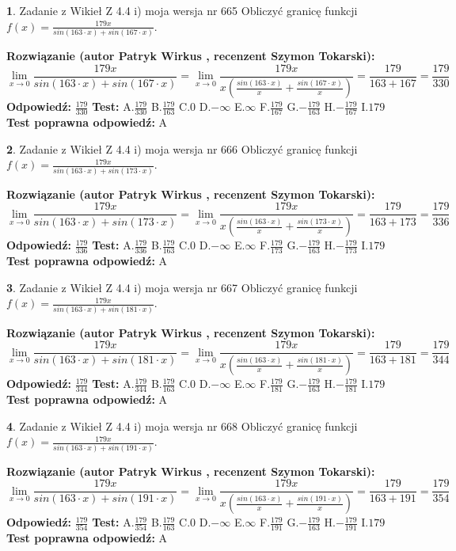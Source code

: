 \documentclass[12pt, a4paper]{article}
\theoremstyle{definition} %
\newtheorem{zad}{}
\newcommand{\zadStart}[1]{\begin{zad}#1\newline}
\newcommand{\zadStop}{\end{zad}}
\newcommand{\rozwStart}[2]{\noindent \textbf{Rozwiązanie (autor #1 , recenzent #2): }\newline}
\newcommand{\rozwStop}{\newline}
\newcommand{\odpStart}{\noindent \textbf{Odpowiedź:}\newline}
\newcommand{\odpStop}{\newline}
\newcommand{\testStart}{\noindent \textbf{Test:}\newline}
\newcommand{\testStop}{\newline}
\newcommand{\kluczStart}{\noindent \textbf{Test poprawna odpowiedź:}\newline}
\newcommand{\kluczStop}{\newline}
\begin{document}
\zadStart{Zadanie z Wikieł Z 4.4 i) moja wersja nr 665}
Obliczyć granicę funkcji $f(x)=\frac{179x}{sin(163\cdot x) +sin(167\cdot x)}$.
\zadStop
\rozwStart{Patryk Wirkus}{Szymon Tokarski}
$$\lim\limits_{x\to 0}\frac{179x}{sin(163\cdot x) +sin(167\cdot x)}=\lim\limits_{x\to 0}\frac{179x}{x(\frac{sin(163\cdot x)}{x}+\frac{sin(167\cdot x)}{x})}=\frac{179}{163+167} = \frac{179}{330}$$
\rozwStop
\odpStart
$\frac{179}{330}$
\odpStop
\testStart
A.$\frac{179}{330}$
B.$\frac{179}{163}$
C.$0$
D.$-\infty$
E.$\infty$
F.$\frac{179}{167}$
G.$-\frac{179}{163}$
H.$-\frac{179}{167}$
I.$179$
\testStop
\kluczStart
A
\kluczStop



\zadStart{Zadanie z Wikieł Z 4.4 i) moja wersja nr 666}
Obliczyć granicę funkcji $f(x)=\frac{179x}{sin(163\cdot x) +sin(173\cdot x)}$.
\zadStop
\rozwStart{Patryk Wirkus}{Szymon Tokarski}
$$\lim\limits_{x\to 0}\frac{179x}{sin(163\cdot x) +sin(173\cdot x)}=\lim\limits_{x\to 0}\frac{179x}{x(\frac{sin(163\cdot x)}{x}+\frac{sin(173\cdot x)}{x})}=\frac{179}{163+173} = \frac{179}{336}$$
\rozwStop
\odpStart
$\frac{179}{336}$
\odpStop
\testStart
A.$\frac{179}{336}$
B.$\frac{179}{163}$
C.$0$
D.$-\infty$
E.$\infty$
F.$\frac{179}{173}$
G.$-\frac{179}{163}$
H.$-\frac{179}{173}$
I.$179$
\testStop
\kluczStart
A
\kluczStop



\zadStart{Zadanie z Wikieł Z 4.4 i) moja wersja nr 667}
Obliczyć granicę funkcji $f(x)=\frac{179x}{sin(163\cdot x) +sin(181\cdot x)}$.
\zadStop
\rozwStart{Patryk Wirkus}{Szymon Tokarski}
$$\lim\limits_{x\to 0}\frac{179x}{sin(163\cdot x) +sin(181\cdot x)}=\lim\limits_{x\to 0}\frac{179x}{x(\frac{sin(163\cdot x)}{x}+\frac{sin(181\cdot x)}{x})}=\frac{179}{163+181} = \frac{179}{344}$$
\rozwStop
\odpStart
$\frac{179}{344}$
\odpStop
\testStart
A.$\frac{179}{344}$
B.$\frac{179}{163}$
C.$0$
D.$-\infty$
E.$\infty$
F.$\frac{179}{181}$
G.$-\frac{179}{163}$
H.$-\frac{179}{181}$
I.$179$
\testStop
\kluczStart
A
\kluczStop



\zadStart{Zadanie z Wikieł Z 4.4 i) moja wersja nr 668}
Obliczyć granicę funkcji $f(x)=\frac{179x}{sin(163\cdot x) +sin(191\cdot x)}$.
\zadStop
\rozwStart{Patryk Wirkus}{Szymon Tokarski}
$$\lim\limits_{x\to 0}\frac{179x}{sin(163\cdot x) +sin(191\cdot x)}=\lim\limits_{x\to 0}\frac{179x}{x(\frac{sin(163\cdot x)}{x}+\frac{sin(191\cdot x)}{x})}=\frac{179}{163+191} = \frac{179}{354}$$
\rozwStop
\odpStart
$\frac{179}{354}$
\odpStop
\testStart
A.$\frac{179}{354}$
B.$\frac{179}{163}$
C.$0$
D.$-\infty$
E.$\infty$
F.$\frac{179}{191}$
G.$-\frac{179}{163}$
H.$-\frac{179}{191}$
I.$179$
\testStop
\kluczStart
A
\kluczStop
\end{document}
